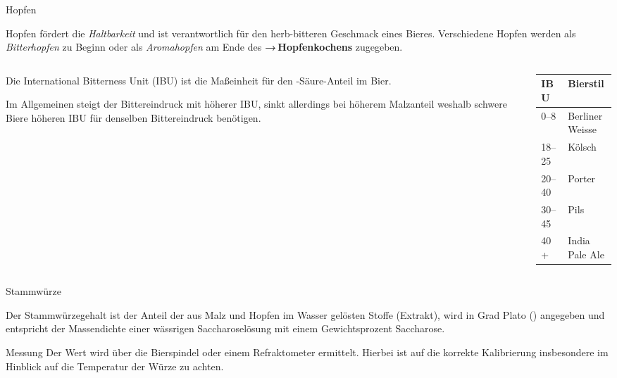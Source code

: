 \documentclass[9pt, ngerman]{beamer}
\newcommand{\forward}[1]{\textbf{→\,#1}}
\begin{document}
\begin{frame}{Hopfen}

  Hopfen fördert die \emph{Haltbarkeit} und ist verantwortlich für den
  herb-bitteren Geschmack eines Bieres. Verschiedene Hopfen werden als
  \emph{Bitterhopfen} zu Beginn oder als \emph{Aromahopfen} am Ende des
  \forward{Hopfenkochens} zugegeben.

  \begin{columns}[onlytextwidth]
    \begin{column}{0.6\textwidth}

      Die International Bitterness Unit (IBU) ist die Maßeinheit für den
      \textalpha-Säure-Anteil im Bier.

      Im Allgemeinen steigt der Bittereindruck mit höherer IBU, sinkt allerdings
      bei höherem Malzanteil weshalb schwere Biere höheren IBU für denselben
      Bittereindruck benötigen.

    \end{column}

    \begin{column}{0.4\textwidth}
      \begin{table}
        \begin{tabular}{ll}
          \textbf{IBU} & \textbf{Bierstil}\\
          \midrule
          \numrange{0}{8}   & Berliner Weisse\\
          \numrange{18}{25} & Kölsch\\
          \numrange{20}{40} & Porter\\
          \numrange{30}{45} & Pils\\
          40+               & India Pale Ale\\
        \end{tabular}
      \end{table}
    \end{column}
  \end{columns}

\end{frame}
\begin{frame}{Stammwürze}

  Der Stammwürzegehalt ist der Anteil der aus Malz und Hopfen im Wasser gelösten
  Stoffe (Extrakt), wird in Grad Plato (\si{\dP})  angegeben und entspricht der
  Massendichte einer wässrigen Saccharoselösung mit einem Gewichtsprozent
  Saccharose.

  \begin{block}{Messung}
    \vspace{0.5em}
    Der Wert wird über die Bierspindel oder einem Refraktometer ermittelt.
    Hierbei ist auf die korrekte Kalibrierung insbesondere im Hinblick auf die
    Temperatur der Würze zu achten.
  \end{block}
\end{frame}
\end{document}
